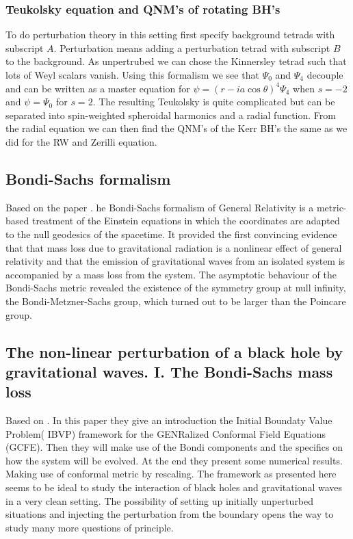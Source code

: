 \documentclass[12 pt]{article}
\begin{document}
	\subsubsection{Teukolsky equation and QNM's of rotating BH's}
	
	To do perturbation theory in this setting first specify background tetrads with subscript $A$. Perturbation means adding a perturbation tetrad with subscript $B$ to the background.  As unpertrubed we can chose the Kinnersley tetrad such that lots of Weyl scalars vanish. Using this formalism we see that $\Psi_0$ and $\Psi_4$ decouple and can be written as a master equation for $\psi = (r-ia\cos \theta )^4 \Psi_4$ when $s= -2$ and $\psi = \Psi_0$ for $s=2$. 
	The resulting Teukolsky is quite complicated but can be separated into spin-weighted spheroidal harmonics and a radial function. From the radial equation we can then find the QNM's of the Kerr BH's the same as we did for the RW and Zerilli equation. 
	
	\subsection{Bondi-Sachs formalism }
	Based on the paper \cite{bondisachs}.
	he Bondi-Sachs formalism of General Relativity is a metric-based treatment of the Einstein equations in which the coordinates are adapted to the null geodesics of the spacetime. It provided the first convincing evidence that that mass loss due to gravitational radiation is a nonlinear effect of general relativity and that the emission of gravitational waves from an isolated system is accompanied by a mass loss from the system. The asymptotic behaviour of the Bondi-Sachs metric revealed the existence of the symmetry group at null infinity, the Bondi-Metzner-Sachs group, which turned out to be larger than the Poincare group.
	
	\subsection{The non-linear perturbation of a black hole by
		gravitational waves. I. The Bondi-Sachs mass loss}
	Based on \cite{Frauendiener}.
	In this paper they give an introduction the Initial Boundaty Value Problem( IBVP) framework for the GENRalized Conformal Field Equations (GCFE). Then they will make use of the Bondi components and the specifics on how the system will be evolved. At the end they present some numerical results. Making use of conformal metric by rescaling. 
	The framework as presented here seems to be ideal to study the interaction of black holes and gravitational waves in a very clean setting. The possibility of setting up initially unperturbed situations and injecting the perturbation from the boundary opens the way to study many more questions of principle.
	
\end{document}
